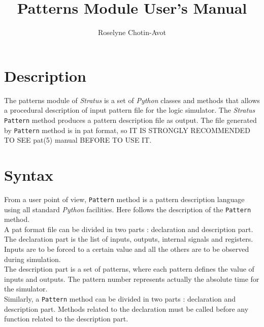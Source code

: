 \documentclass[12pt]{article}
\date   {}
\title  {Patterns Module User's Manual}
\author {Roselyne Chotin-Avot}
\begin{document}
\setlength{\footrulewidth}{0.6pt}
\maketitle


\tableofchildlinks
\htmlrule

\section{Description}
The patterns module of \emph{Stratus} is a set of \emph{Python} classes and 
methods that allows a procedural description of input pattern  file  for  the 
logic  simulator. The \emph{Stratus} \verb-Pattern- method produces a pattern 
description file as output. The file generated by \verb-Pattern- method is in 
pat format, so IT IS STRONGLY RECOMMENDED TO SEE pat(5) manual BEFORE TO USE 
IT.

\section{Syntax}
From a user point of view, \verb-Pattern- method is a pattern description 
language using all standard \emph{Python} facilities. Here follows the 
description of the \verb-Pattern- method.\\
A pat format file can be divided in two parts : declaration and description 
part.\\
The declaration part is the list of inputs, outputs, internal signals and 
registers. Inputs are to be forced to a certain  value and all the others are 
to be observed during simulation.\\
The description part is a set of patterns, where each pattern defines the value 
of inputs and outputs. The pattern number represents actually the absolute time 
for the simulator.\\
Similarly, a \verb-Pattern- method can be divided in two parts : declaration 
and description part. Methods related  to  the  declaration must be called 
before any function related to the description part.
\end{document}
